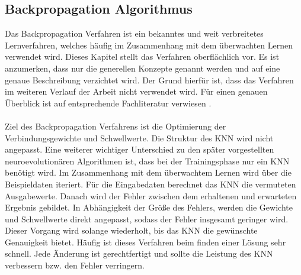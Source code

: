 \subsection{Backpropagation Algorithmus}
Das Backpropagation Verfahren ist ein bekanntes und weit verbreitetes Lernverfahren, welches häufig im Zusammenhang mit dem überwachten Lernen verwendet wird. Dieses Kapitel stellt das Verfahren oberflächlich vor. Es ist anzumerken, dass nur die generellen Konzepte genannt werden und auf eine genaue Beschreibung verzichtet wird. Der Grund hierfür ist, dass das Verfahren im weiteren Verlauf der Arbeit nicht verwendet wird. Für einen genauen Überblick ist auf entsprechende Fachliteratur verwiesen \cite{zell2003simulation}.
\\\\
Ziel des Backpropagation Verfahrens ist die Optimierung der Verbindungsgewichte und Schwellwerte. Die Struktur des \ac{KNN} wird nicht angepasst. Eine weiterer wichtiger Unterschied zu den später vorgestellten neuroevolutionären Algorithmen ist, dass bei der Trainingsphase nur ein \ac{KNN} benötigt wird. Im Zusammenhang mit dem überwachtem Lernen wird über die Beispieldaten iteriert. Für die Eingabedaten berechnet das \ac{KNN} die vermuteten Ausgabewerte. Danach wird der Fehler zwischen dem erhaltenen und erwarteten Ergebnis gebildet. In Abhängigkeit der Größe des Fehlers, werden die Gewichte und Schwellwerte direkt angepasst, sodass der Fehler insgesamt geringer wird. Dieser Vorgang wird solange wiederholt, bis das \ac{KNN} die gewünschte Genauigkeit bietet. Häufig ist dieses Verfahren beim finden einer Lösung sehr schnell. Jede Änderung ist gerechtfertigt und sollte die Leistung des \ac{KNN} verbessern bzw. den Fehler verringern.  



